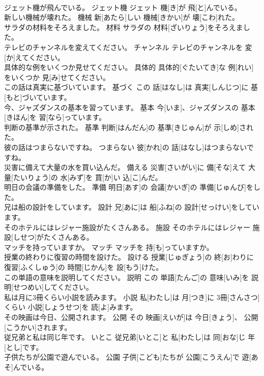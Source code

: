 \documentclass[8pt]{extreport}
\begin{document}
\begin{CJK}{UTF8}{min}
\\	ジェット機が飛んでいる。	ジェット機	ジェット 機[き]が 飛[と]んでいる。	
\\	新しい機械が壊れた。	機械	新[あたら]しい 機械[きかい]が 壊[こわ]れた。	
\\	サラダの材料をそろえました。	材料	サラダの 材料[ざいりょう]をそろえました。	
\\	テレビのチャンネルを変えてください。	チャンネル	テレビのチャンネルを 変[か]えてください。	
\\	具体的な例をいくつか見せてください。	具体的	具体的[ぐたいてき]な 例[れい]をいくつか 見[み]せてください。	
\\	この話は真実に基づいています。	基づく	この 話[はなし]は 真実[しんじつ]に 基[もと]づいています。	
\\	今、ジャズダンスの基本を習っています。	基本	今[いま]、ジャズダンスの 基本[きほん]を 習[なら]っています。	
\\	判断の基準が示された。	基準	判断[はんだん]の 基準[きじゅん]が 示[しめ]された。	
\\	彼の話はつまらないですね。	つまらない	彼[かれ]の 話[はなし]はつまらないですね。	
\\	災害に備えて大量の水を買い込んだ。	備える	災害[さいがい]に 備[そな]えて 大量[たいりょう]の 水[みず]を 買[か]い 込[こ]んだ。	
\\	明日の会議の準備をした。	準備	明日[あす]の 会議[かいぎ]の 準備[じゅんび]をした。	
\\	兄は船の設計をしています。	設計	兄[あに]は 船[ふね]の 設計[せっけい]をしています。	
\\	そのホテルにはレジャー施設がたくさんある。	施設	そのホテルにはレジャー 施設[しせつ]がたくさんある。	
\\	マッチを持っていますか。	マッチ	マッチを 持[も]っていますか。	
\\	授業の終わりに復習の時間を設けた。	設ける	授業[じゅぎょう]の 終[お]わりに 復習[ふくしゅう]の 時間[じかん]を 設[もう]けた。	
\\	この単語の意味を説明してください。	説明	この 単語[たんご]の 意味[いみ]を 説明[せつめい]してください。	
\\	私は月に3冊くらい小説を読みます。	小説	私[わたし]は 月[つき]に 3冊[さんさつ]くらい 小説[しょうせつ]を 読[よ]みます。	
\\	その映画は今日、公開されます。	公開	その 映画[えいが]は 今日[きょう]、 公開[こうかい]されます。	
\\	従兄弟と私は同じ年です。	いとこ	従兄弟[いとこ]と 私[わたし]は 同[おな]じ 年[とし]です。	
\\	子供たちが公園で遊んでいる。	公園	子供[こども]たちが 公園[こうえん]で 遊[あそ]んでいる。	

\end{CJK}
\end{document}

